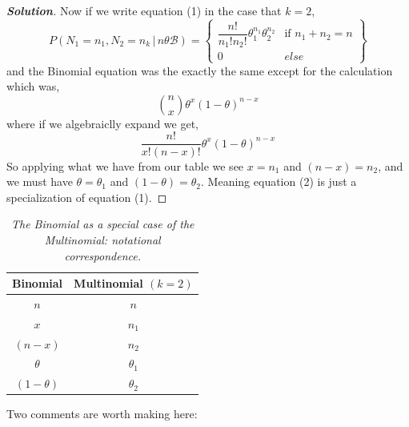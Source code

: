 \documentclass[12pt]{article}
\newcommand{\given}{\, | \,}
\newcommand{\lrc}[1]{\left\{#1\right\}}
\newenvironment{solution}{\begin{tcolorbox}[breakable]\begin{proof}[\textbf{\textit{Solution}}] }{\end{proof}\end{tcolorbox}}
\begin{document}
\begin{itemize}
\begin{solution}
    Now if we write equation (1) in the case that $k = 2$, 
    \[P(N_1 = n_1, N_2 = n_k \given n \theta \mathcal{B}) = \lrc{\begin{array}{cc}\dfrac{n!}{n_1!n_2!}\theta_1^{n_1}\theta_2^{n_2}  & \text{if } n_1 + n_2 = n \\ 0 & else\end{array}}\]
    and the Binomial equation was the exactly the same except for the calculation which was,
    \[\binom{n}{x} \theta^{x} (1-\theta)^{n-x} \]
    where if we algebraiclly expand we get,
    \[\dfrac{n!}{x!(n-x)!}\theta^{x}(1-\theta)^{n-x}\]
    So applying what we have from our table we see $x = n_1$ and $(n-x) = n_2$, and we must have $\theta = \theta_1$ and $(1-\theta) = \theta_2$. Meaning equation (2) is just a specialization of equation (1). 
\end{solution}

\begin{table}[t!]

\centering

\caption{\textit{The Binomial as a special case of the Multinomial: notational correspondence.}}

\vspace*{0.1in}

\begin{tabular}{c|c}

Binomial & Multinomial $( k = 2 )$ \\

\hline

$n$ & $n$ \\

$x$ & $n_1$ \\

$( n - x )$ & $n_2$ \\

$\theta$ & $\theta_1$ \\

$( 1 - \theta )$ & $\theta_2$

\end{tabular}

\label{t:correspondence}

\end{table}

\end{itemize}

Two comments are worth making here:
\end{document}
